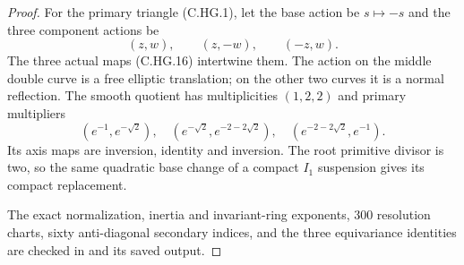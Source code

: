\begin{proof}
For the primary triangle
(C.HG.1), let the base action
be $s\mapsto-s$ and the three
component actions be
\[
            (z,w),\qquad(z,-w),\qquad(-z,w).
\tag{C.WH.16}\label{cdp:eq:C.WH.16}
\]
The three actual maps
(C.HG.16) intertwine them.
The action on the middle
double curve is a free
elliptic translation; on
the other two curves it
is a normal reflection.
The smooth quotient has
multiplicities $(1,2,2)$
and primary multipliers
\[
 (e^{-1},e^{-\sqrt2}),\quad
 (e^{-\sqrt2},e^{-2-2\sqrt2}),\quad
 (e^{-2-2\sqrt2},e^{-1}).
\tag{C.WH.17}\label{cdp:eq:C.WH.17}
\]
Its axis maps are inversion,
identity and inversion.
The root primitive divisor
is two, so the same quadratic
base change of a compact
$I_1$ suspension gives its
compact replacement.

The exact normalization,
inertia and invariant-ring
exponents, 300 resolution
charts, sixty anti-diagonal
secondary indices, and the
three equivariance identities
are checked in
and its saved output.
\end{proof}


